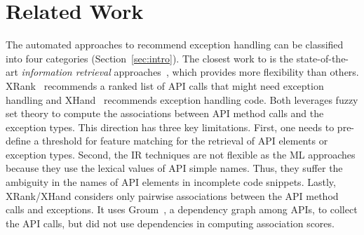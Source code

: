 \section{Related Work}
\label{sec:related}

The automated approaches to recommend exception handling can be
classified into four categories (Section~\ref{sec:intro}).
The closest work to {\tool} is the state-of-the-art {\em information
  retrieval} approaches~\cite{xrank-fse20}, which provides more
flexibility than others. XRank~\cite{xrank-fse20} recommends a
ranked list of API calls that might need exception handling and
XHand~\cite{xrank-fse20} recommends exception handling code. Both
leverages fuzzy set theory to compute the associations between API
method calls and the exception types. This direction has three key
limitations. First, one needs to pre-define a threshold for feature
matching for the retrieval of API elements or exception types. Second,
the IR techniques are not flexible as the ML approaches because they
use the lexical values of API simple names. Thus, they suffer the
ambiguity in the names of API elements in incomplete code
snippets. Lastly, XRank/XHand considers only pairwise associations
between the API method calls and exceptions.
It uses Groum~\cite{NNP+09}, a dependency graph among
APIs, to collect the API calls, but did not use dependencies
in computing association scores.

